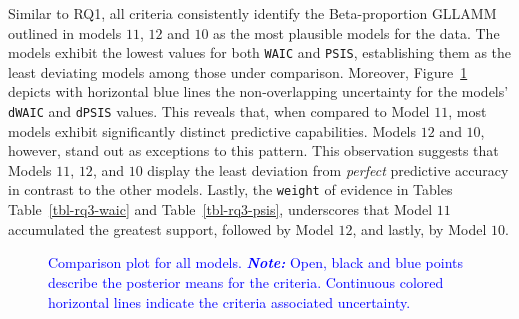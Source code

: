 \documentclass[
  authoryear,
  preprint,
  1p]{elsarticle}
\begin{document}
Similar to RQ1, all criteria consistently identify the Beta-proportion
GLLAMM outlined in models \(11\), \(12\) and \(10\) as the most
plausible models for the data. The models exhibit the lowest values for
both \texttt{WAIC} and \texttt{PSIS}, establishing them as the least
deviating models among those under comparison. Moreover,
Figure~\ref{fig-rq3-waic-psis} depicts with horizontal blue lines the
non-overlapping uncertainty for the models' \texttt{dWAIC} and
\texttt{dPSIS} values. This reveals that, when compared to Model \(11\),
most models exhibit significantly distinct predictive capabilities.
Models \(12\) and \(10\), however, stand out as exceptions to this
pattern. This observation suggests that Models \(11\), \(12\), and
\(10\) display the least deviation from \emph{perfect} predictive
accuracy in contrast to the other models. Lastly, the \texttt{weight} of
evidence in Tables Table~\ref{tbl-rq3-waic} and
Table~\ref{tbl-rq3-psis}, underscores that Model \(11\) accumulated the
greatest support, followed by Model \(12\), and lastly, by Model \(10\).

\label{cell-fig-rq3-waic-psis}
\begin{figure}[H]


\caption{\label{fig-rq3-waic-psis}\textcolor{blue}{Comparison plot for all models.
\textbf{\emph{Note:}} Open, black and blue points describe the posterior
means for the criteria. Continuous colored horizontal lines indicate the
criteria associated uncertainty.}}

\end{figure}%
\end{document}
